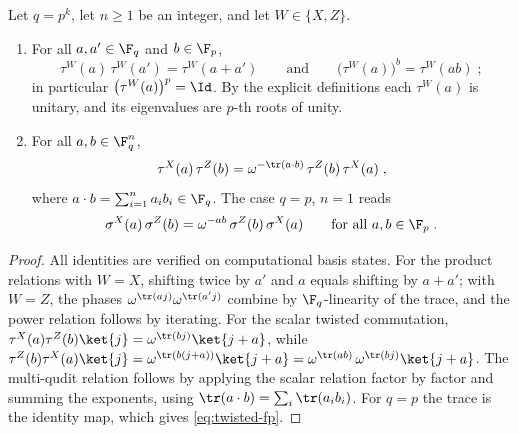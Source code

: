 \begin{lemma}\label{lem:twisted-commutation}
	\leanok
	Let $q = p^k$, let $n \ge 1$ be an integer, and let $W \in \{X, Z\}$.
	\begin{enumerate}
		\item For all $a, a' \in \F_q$ and $b \in \F_p$,
		      \begin{equation}\label{eq:pauli-product-power}
			      \tau^W(a)\, \tau^W(a') = \tau^W(a + a')
			      \qquad \text{and} \qquad
			      \bigl(\tau^W(a)\bigr)^b = \tau^W(ab)\;;
		      \end{equation}
		      in particular $\bigl(\tau^W(a)\bigr)^p = \Id$. By the explicit
		      definitions each $\tau^W(a)$ is unitary, and its eigenvalues are
		      $p$-th roots of unity.
		\item For all $a, b \in \F_q^n$,
		      \begin{equation}\label{eq:twisted-fq}
			      \tau^X(a)\, \tau^Z(b)
			      = \omega^{-\tr(a \cdot b)}\, \tau^Z(b)\, \tau^X(a)\;,
		      \end{equation}
		      where $a \cdot b = \sum_{i=1}^n a_i b_i \in \F_q$. The case
		      $q = p$, $n = 1$ reads
		      \begin{equation}\label{eq:twisted-fp}
			      \sigma^X(a)\, \sigma^Z(b)
			      = \omega^{-ab}\, \sigma^Z(b)\, \sigma^X(a)
			      \qquad \text{for all } a, b \in \F_p\;.
		      \end{equation}
	\end{enumerate}
\end{lemma}
\begin{proof}
	\leanok
	All identities are verified on computational basis states. For the product
	relations with $W = X$, shifting twice by $a'$ and $a$ equals shifting by
	$a + a'$; with $W = Z$, the phases $\omega^{\tr(aj)}\omega^{\tr(a'j)}$
	combine by $\F_q$-linearity of the trace, and the power relation follows by
	iterating. For the scalar twisted commutation,
	$\tau^X(a)\tau^Z(b)\ket{j} = \omega^{\tr(bj)}\ket{j + a}$, while
	$\tau^Z(b)\tau^X(a)\ket{j} = \omega^{\tr(b(j+a))}\ket{j + a} =
	\omega^{\tr(ab)}\,\omega^{\tr(bj)}\ket{j + a}$. The multi-qudit relation
	follows by applying the scalar relation factor by factor and summing the
	exponents, using $\tr(a \cdot b) = \sum_i \tr(a_i b_i)$. For $q = p$ the
	trace is the identity map, which gives \eqref{eq:twisted-fp}.
\end{proof}

